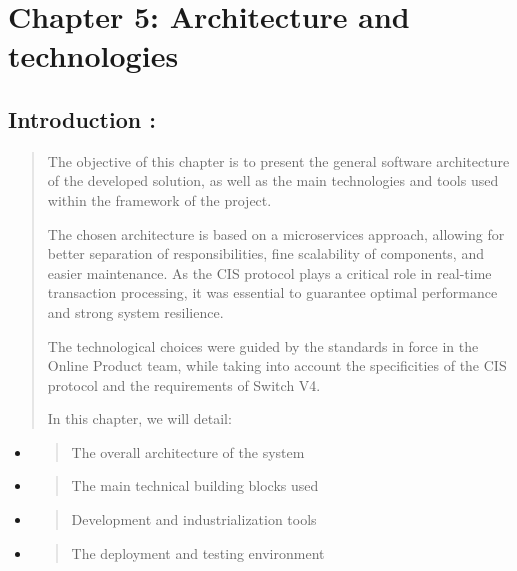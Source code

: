 \documentclass[12pt,a4paper]{report}
\begin{document}
\hypertarget{chapter-5-architecture-and-technologies}{%
\section{\texorpdfstring{Chapter 5: Architecture and technologies
}{Chapter 5: Architecture and technologies }}\label{chapter-5-architecture-and-technologies}}

\hypertarget{introduction-3}{%
\subsection{\texorpdfstring{\textbf{Introduction
:}}{Introduction :}}\label{introduction-3}}

\begin{quote}
The objective of this chapter is to present the general software
architecture of the developed solution, as well as the main technologies
and tools used within the framework of the project.

The chosen architecture is based on a microservices approach, allowing
for better separation of responsibilities, fine scalability of
components, and easier maintenance. As the CIS protocol plays a critical
role in real-time transaction processing, it was essential to guarantee
optimal performance and strong system resilience.

The technological choices were guided by the standards in force in the
Online Product team, while taking into account the specificities of the
CIS protocol and the requirements of Switch V4.

In this chapter, we will detail:
\end{quote}

\begin{itemize}
\item
  \begin{quote}
  The overall architecture of the system
  \end{quote}
\item
  \begin{quote}
  The main technical building blocks used
  \end{quote}
\item
  \begin{quote}
  Development and industrialization tools
  \end{quote}
\item
  \begin{quote}
  The deployment and testing environment
  \end{quote}
\end{itemize}
\end{document}
